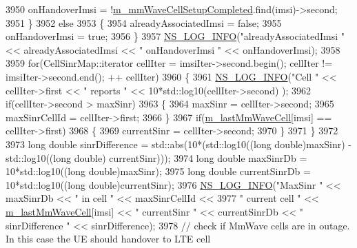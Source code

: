 \begin{DoxyCode}
3950         onHandoverImsi = !\hyperlink{classns3_1_1LteEnbRrc_ad19d6f4c123115e1d13e34609781ab20}{m\_mmWaveCellSetupCompleted}.find(imsi)->second;
3951       \}
3952       \textcolor{keywordflow}{else}
3953       \{
3954         alreadyAssociatedImsi = \textcolor{keyword}{false};
3955         onHandoverImsi = \textcolor{keyword}{true};
3956       \}
3957       \hyperlink{group__logging_gafbd73ee2cf9f26b319f49086d8e860fb}{NS\_LOG\_INFO}(\textcolor{stringliteral}{"alreadyAssociatedImsi "} << alreadyAssociatedImsi << \textcolor{stringliteral}{" onHandoverImsi "} << 
      onHandoverImsi);
3958 
3959       \textcolor{keywordflow}{for}(CellSinrMap::iterator cellIter = imsiIter->second.begin(); cellIter != imsiIter->second.end(); ++
      cellIter)
3960       \{
3961         \hyperlink{group__logging_gafbd73ee2cf9f26b319f49086d8e860fb}{NS\_LOG\_INFO}(\textcolor{stringliteral}{"Cell "} << cellIter->first << \textcolor{stringliteral}{" reports "} << 10*std::log10(cellIter->second)
      );
3962         \textcolor{keywordflow}{if}(cellIter->second > maxSinr)
3963         \{
3964           maxSinr = cellIter->second;
3965           maxSinrCellId = cellIter->first;
3966         \}
3967         \textcolor{keywordflow}{if}(\hyperlink{classns3_1_1LteEnbRrc_a0d7b04f0383b0dc3f6a7360b87cbaeee}{m\_lastMmWaveCell}[imsi] == cellIter->first)
3968         \{
3969           currentSinr = cellIter->second;
3970         \}
3971       \}
3972 
3973       \textcolor{keywordtype}{long} \textcolor{keywordtype}{double} sinrDifference = std::abs(10*(std::log10((\textcolor{keywordtype}{long} \textcolor{keywordtype}{double})maxSinr) - std::log10((\textcolor{keywordtype}{long} \textcolor{keywordtype}{double})
      currentSinr)));
3974       \textcolor{keywordtype}{long} \textcolor{keywordtype}{double} maxSinrDb = 10*std::log10((\textcolor{keywordtype}{long} \textcolor{keywordtype}{double})maxSinr);
3975       \textcolor{keywordtype}{long} \textcolor{keywordtype}{double} currentSinrDb = 10*std::log10((\textcolor{keywordtype}{long} \textcolor{keywordtype}{double})currentSinr);
3976       \hyperlink{group__logging_gafbd73ee2cf9f26b319f49086d8e860fb}{NS\_LOG\_INFO}(\textcolor{stringliteral}{"MaxSinr "} << maxSinrDb << \textcolor{stringliteral}{" in cell "} << maxSinrCellId << 
3977           \textcolor{stringliteral}{" current cell "} << \hyperlink{classns3_1_1LteEnbRrc_a0d7b04f0383b0dc3f6a7360b87cbaeee}{m\_lastMmWaveCell}[imsi] << \textcolor{stringliteral}{" currentSinr "} << currentSinrDb <<
       \textcolor{stringliteral}{" sinrDifference "} << sinrDifference);
3978       \textcolor{comment}{// check if MmWave cells are in outage. In this case the UE should handover to LTE cell}

\end{DoxyCode}
